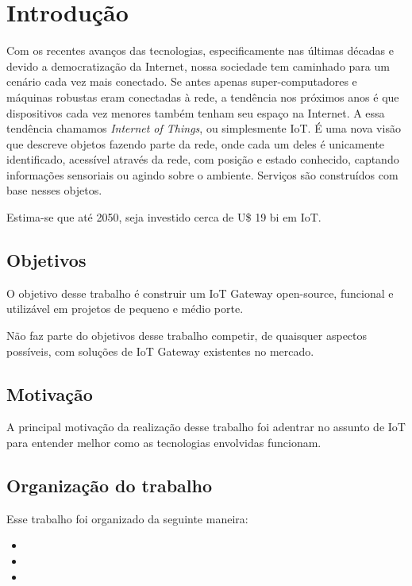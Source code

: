 \section*{Introdução}
\label{sec:intro}

Com os recentes avanços das tecnologias, especificamente nas últimas décadas e devido a democratização da Internet, nossa sociedade tem caminhado para um cenário cada vez mais conectado. Se antes apenas super-computadores e máquinas robustas eram conectadas à rede, a tendência nos próximos anos é que dispositivos cada vez menores também tenham seu espaço na Internet.
A essa tendência chamamos \textit{Internet of Things}, ou simplesmente IoT. É uma nova visão que descreve objetos fazendo parte da rede, onde cada um deles é unicamente identificado, acessível através da rede, com posição e estado conhecido, captando informações sensoriais ou agindo sobre o ambiente. Serviços são construídos com base nesses objetos.

Estima-se que até 2050, seja investido cerca de U\$ 19 bi em IoT.

\subsection*{Objetivos}
\label{subsec:objetivos}
O objetivo desse trabalho é construir um IoT Gateway open-source, funcional e utilizável em projetos de pequeno e médio porte.

Não faz parte do objetivos desse trabalho competir, de quaisquer aspectos possíveis, com soluções de IoT Gateway existentes no mercado.

\subsection*{Motivação}
\label{subsec:motivacao}
A principal motivação da realização desse trabalho foi adentrar no assunto de IoT para entender melhor como as tecnologias envolvidas funcionam.

\subsection*{Organização do trabalho}
\label{subsec:organizacao}

Esse trabalho foi organizado da seguinte maneira:

\begin{itemize}
	\item {}
	\item {}
	\item {}
	
\end{itemize}


